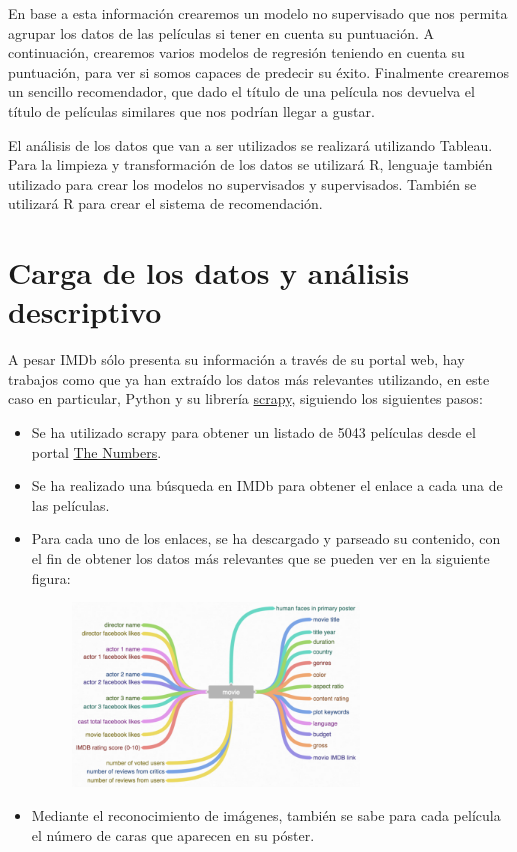 \documentclass{article}
\begin{document}
En base a esta información crearemos un modelo no supervisado que nos permita agrupar los datos de las películas si tener en cuenta su puntuación. A continuación, crearemos varios modelos de regresión teniendo en cuenta su puntuación, para ver si somos capaces de predecir su éxito. Finalmente crearemos un sencillo recomendador, que dado el título de una película nos devuelva el título de películas similares que nos podrían llegar a gustar.

El análisis de los datos que van a ser utilizados se realizará utilizando Tableau. Para la limpieza y transformación de los datos se utilizará R, lenguaje también utilizado para crear los modelos no supervisados y supervisados. También se utilizará R para crear el sistema de recomendación.  

\clearpage

\section{Carga de los datos y análisis descriptivo}

A pesar IMDb sólo presenta su información a través de su portal web, hay trabajos como \cite{imdb5000} que ya han extraído los datos más relevantes utilizando, en este caso en particular, Python y su librería \href{https://scrapy.org/}{scrapy}, siguiendo los siguientes pasos:

\begin{itemize}
  \item Se ha utilizado scrapy para obtener un listado de 5043 películas desde el portal \href{http://www.the-numbers.com/movie/budgets/all}{The Numbers}.
  \item Se ha realizado una búsqueda en IMDb para obtener el enlace a cada una de las películas.
  \item Para cada uno de los enlaces, se ha descargado y parseado su contenido, con el fin de obtener los datos más relevantes que se pueden ver en la siguiente figura:

    \begin{figure}[h]
    \centering
    \includegraphics[width=3in,clip,keepaspectratio]{./images_latex/imdb_attributes.png}
    \label{fig:imdb_attributes}
    \end{figure}

  \item Mediante el reconocimiento de imágenes, también se sabe para cada película el número de caras que aparecen en su póster.
\end{itemize}
\end{document}
